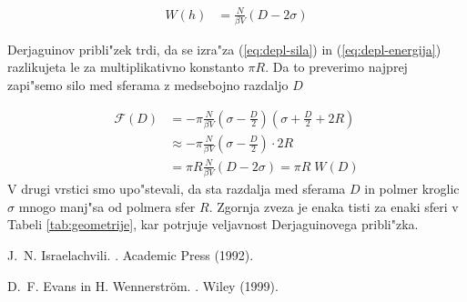 \documentclass[a4paper,10pt]{article}
\begin{document}
\begin{align}
\label{eq:depl-energija}
 W(h) &= \frac{N}{\beta V} (D - 2\sigma)
\end{align}

Derjaguinov pribli"zek trdi, da se izra"za (\ref{eq:depl-sila}) in (\ref{eq:depl-energija}) razlikujeta le za multiplikativno konstanto $\pi R$. 
Da to preverimo najprej zapi"semo silo med sferama z medsebojno razdaljo $D$

\begin{align}
 \mathcal F(D) &= -\pi \frac{N}{\beta V} \left(\sigma - \frac{D}{2} \right) \left(\sigma + \frac{D}{2} + 2R\right) \\
  &\approx -\pi\frac{N}{\beta V} \left(\sigma - \frac{D}{2} \right) \cdot 2R \\
  &= \pi R \frac{N}{\beta V}(D - 2\sigma) = \pi R\; W(D)
\end{align}
V drugi vrstici smo upo"stevali, da sta razdalja med sferama $D$ in polmer kroglic $\sigma$ mnogo manj"sa od polmera sfer $R$. 
Zgornja zveza je enaka tisti za enaki sferi v Tabeli \ref{tab:geometrije}, kar potrjuje veljavnost Derjaguinovega pribli"zka. 

\begin{thebibliography}{10}

J.~N. Israelachvili.
.
\newblock Academic Press (1992).

D.~F. Evans in H. Wennerstr\"om. 
.
\newblock Wiley (1999).



\end{thebibliography}
\end{document}
